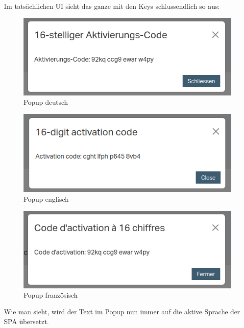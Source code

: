 Im tatsächlichen UI sieht das ganze mit den Keys schlussendlich so aus:
\begin{figure}[H]
	\begin{center}
		\includegraphics[width=1.0\textwidth]{ressourcen/popup-de}
		\caption[Popup deutsch]{Popup deutsch}\label{fig:popup-de}
	\end{center}
\end{figure}
\begin{figure}[H]
	\begin{center}
		\includegraphics[width=1.0\textwidth]{ressourcen/popup-en}
			\caption[Popup englisch]{Popup englisch}\label{fig:popup-en}
	\end{center}
\end{figure}	
\begin{figure}[H]
	\begin{center}
		\includegraphics[width=1.0\textwidth]{ressourcen/popup-fr}
		\caption[Popup französisch]{Popup französisch}\label{fig:popup-fr}
	\end{center}
\end{figure}
\noindent Wie man sieht, wird der Text im Popup nun immer auf die aktive Sprache der SPA übersetzt.
